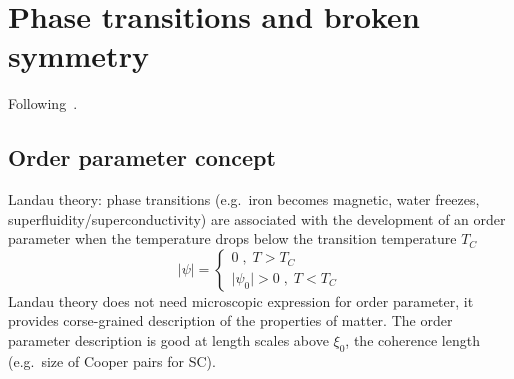 \documentclass[../main.tex]{subfiles}
\begin{document}







\section{Phase transitions and broken symmetry}

Following~\cite[ch. 11]{colemanIntroductionManyBodyPhysics2015}.

\subsection{Order parameter concept}

Landau theory: phase transitions (e.g.\ iron becomes magnetic, water freezes, superfluidity/superconductivity) are associated with the development of an order parameter when the temperature drops below the transition temperature \(T_C\) 
\begin{equation}
    \vert \psi \vert =
    \begin{cases}
        0\;,\; T > T_C \\
        \vert \psi_0 \vert > 0 \;,\; T < T_C
    \end{cases}
\end{equation}
Landau theory does not need microscopic expression for order parameter, it provides corse-grained description of the properties of matter.
The order parameter description is good at length scales above \(\xi_0\), the coherence length (e.g.\ size of Cooper pairs for SC).
\end{document}
